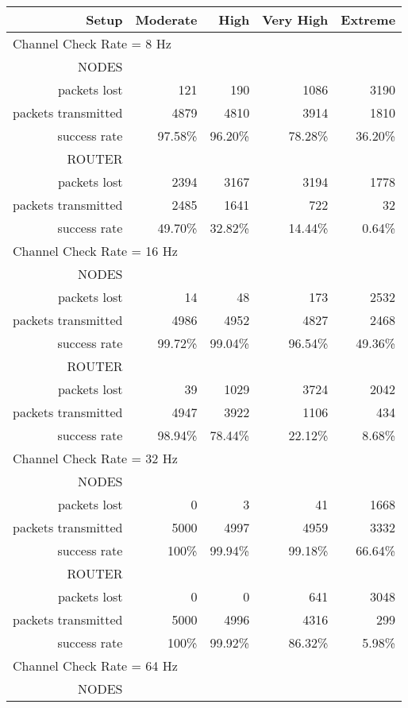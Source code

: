 \documentclass[a4paper,twoside]{article}
\begin{document}
\begin{table*}[htbp]
\centering
\begin{tabular}{|r|r|r|r|r|}
\hline
Setup & Moderate & High & Very High & Extreme \\
\hline
\multicolumn{5}{|l|}{Channel Check Rate = 8 Hz}\\
\hline
NODES & & & & \\
packets lost & 121 & 190 & 1086 & 3190 \\
packets transmitted & 4879 & 4810 & 3914 & 1810 \\
success rate & 97.58\% & 96.20\% & 78.28\% & 36.20\% \\
ROUTER & & & & \\
packets lost & 2394 & 3167 & 3194 & 1778 \\
packets transmitted & 2485 & 1641 & 722 & 32 \\
success rate & 49.70\% & 32.82\% & 14.44\% & 0.64\% \\
\hline
\multicolumn{5}{|l|}{Channel Check Rate = 16 Hz}\\
\hline
NODES & & & & \\
packets lost & 14 & 48 & 173 & 2532 \\
packets transmitted & 4986 & 4952 & 4827 & 2468 \\
success rate & 99.72\% & 99.04\% & 96.54\% & 49.36\% \\
ROUTER & & & & \\
packets lost & 39 & 1029 & 3724 & 2042 \\
packets transmitted & 4947 & 3922 & 1106 & 434 \\
success rate & 98.94\% & 78.44\% & 22.12\% & 8.68\% \\
\hline
\multicolumn{5}{|l|}{Channel Check Rate = 32 Hz}\\
\hline
NODES & & & & \\
packets lost & 0 & 3 & 41 & 1668 \\
packets transmitted & 5000 & 4997 & 4959 & 3332 \\
success rate & 100\% & 99.94\% & 99.18\% & 66.64\% \\
ROUTER & & & & \\
packets lost & 0 & 0 & 641 & 3048 \\
packets transmitted & 5000 & 4996 & 4316 & 299 \\
success rate & 100\% & 99.92\% & 86.32\% & 5.98\% \\
\hline
\multicolumn{5}{|l|}{Channel Check Rate = 64 Hz}\\
\hline
NODES & & & & \\

\end{tabular}
\end{table*}
\end{document}
